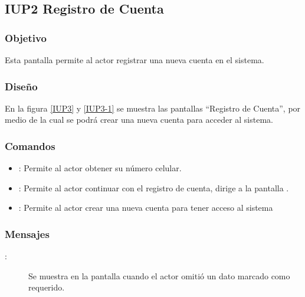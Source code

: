 \subsection{IUP2 Registro de Cuenta}
 
\subsubsection{Objetivo}

    Esta pantalla permite al actor registrar una nueva cuenta en el sistema.

\subsubsection{Diseño}

    En la figura \ref{IUP3} y \ref{IUP3-1}  se muestra las pantallas ``Registro de Cuenta'', por medio de la cual se podrá crear una nueva cuenta para  acceder al sistema. \\

    \newpage

\subsubsection{Comandos}
\begin{itemize}
    \item {}: Permite al actor obtener su número celular.
    \item {}: Permite al actor continuar con el registro de cuenta, dirige a la pantalla .
    \item {}: Permite al actor crear una nueva cuenta para tener acceso al sistema
    
\end{itemize}

\subsubsection{Mensajes}

\begin{description}
    \item[:] Se muestra en la pantalla  cuando el actor omitió un dato marcado como requerido.
    
\end{description}
